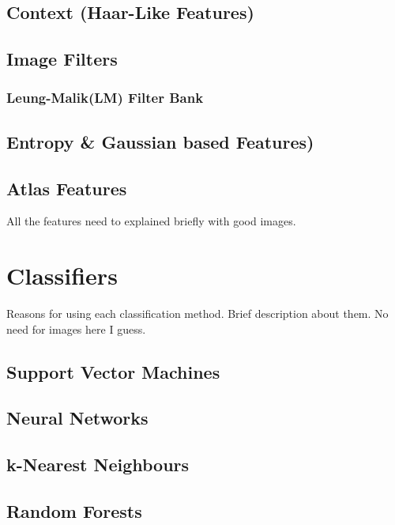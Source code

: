 \documentclass{article} %
\begin{document}
\subsection{Context (Haar-Like Features)}

\subsection{Image Filters}

\subsubsection{Leung-Malik(LM) Filter Bank}

\subsection{Entropy \& Gaussian based Features)}

\subsection{Atlas Features}

All the features need to explained briefly with good images.

\section{Classifiers}

Reasons for using each classification method. Brief description about them. No need for images here I guess.  

\subsection{Support Vector Machines}

\subsection{Neural Networks}

\subsection{k-Nearest Neighbours}

\subsection{Random Forests}
\end{document}
